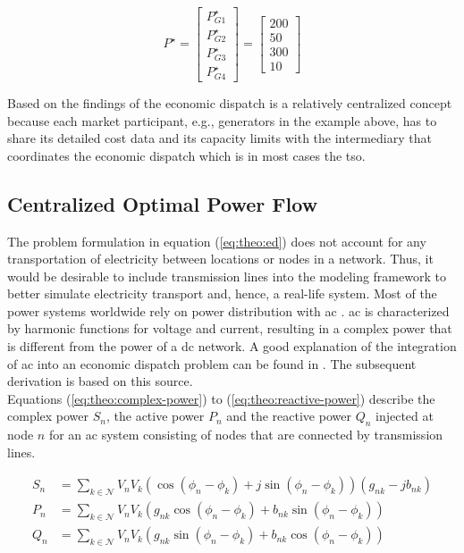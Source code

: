 \begin{equation}
	P^{\star} = \begin{bmatrix}
		P_{G1}^{\star} \\
		P_{G2}^{\star} \\
		P_{G3}^{\star} \\
		P_{G4}^{\star}
	\end{bmatrix} = \begin{bmatrix}
		200 \\
		50 \\
		300 \\
		10
	\end{bmatrix}
\end{equation}

Based on the findings of \citet{ahlqvist2022} the economic dispatch is a relatively centralized concept because each market participant, e.g., generators in the example above, has to share its detailed cost data and its capacity limits with the intermediary that coordinates the economic dispatch which is in most cases the \gls{tso}. 

\subsection{Centralized Optimal Power Flow}

The problem formulation in equation (\ref{eq:theo:ed}) does not account for any transportation of electricity between locations or nodes in a network. Thus, it would be desirable to include transmission lines into the modeling framework to better simulate electricity transport and, hence, a real-life system. Most of the power systems worldwide rely on power distribution with \gls{ac} \citep{mieth2021}. \gls{ac} is characterized by harmonic functions for voltage and current, resulting in a complex power that is different from the power of a \gls{dc} network. A good explanation of the integration of \gls{ac} into an economic dispatch problem can be found in \citet{weinhold2022}. The subsequent derivation is based on this source.\\ 

Equations (\ref{eq:theo:complex-power}) to (\ref{eq:theo:reactive-power}) describe the complex power $S_n$, the active power $P_n$ and the reactive power $Q_n$ injected at node $n$ for an \gls{ac} system consisting of nodes that are connected by transmission lines.

\begin{subequations}
	\begin{align}
		S_n &= \sum_{k \in \mathcal{N}} V_n V_k(\cos{(\phi_n-\phi_k)} + j\sin{(\phi_n-\phi_k)})(g_{nk} - jb_{nk}) \label{eq:theo:complex-power} \\
		P_n &= \sum_{k \in \mathcal{N}} V_n V_k (g_{nk} \cos{(\phi_n-\phi_k)} + b_{nk}\sin{(\phi_n-\phi_k)}) \\
		Q_n &= \sum_{k \in \mathcal{N}} V_n V_k (g_{nk} \sin{(\phi_n-\phi_k)} + b_{nk} \cos{(\phi_n-\phi_k)}) \label{eq:theo:reactive-power}
	\end{align}
\end{subequations}

